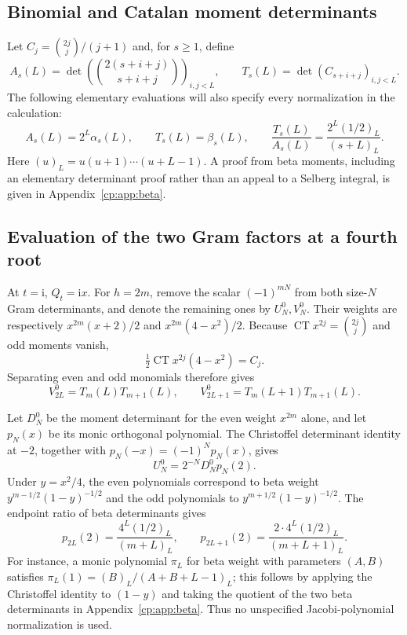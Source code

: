 \documentclass[11pt]{article}
\theoremstyle{definition}
\theoremstyle{remark}
\newcommand{\CT}{\operatorname{CT}}
\newcommand{\ii}{\mathrm i}
\newcommand{\rise}[2]{(#1)_{#2}}
\theoremstyle{definition}
\theoremstyle{plain}
\numberwithin{equation}{section}
\begin{document}
\subsection{Binomial and Catalan moment determinants}
Let $C_j=\binom{2j}{j}/(j+1)$ and, for $s\ge1$, define
\begin{equation}
 A_s(L)=\det\left(\binom{2(s+i+j)}{s+i+j}\right)_{i,j<L},\qquad
 T_s(L)=\det(C_{s+i+j})_{i,j<L}.
 \label{cp:eq:AT}
\end{equation}
The following elementary evaluations will also specify every normalization
in the calculation:
\begin{equation}
 A_s(L)=2^L\alpha_s(L),\qquad T_s(L)=\beta_s(L),\qquad
 \frac{T_s(L)}{A_s(L)}=
 \frac{2^L\rise{1/2}{L}}{\rise{s+L}{L}}.
 \label{cp:eq:ATeval}
\end{equation}
Here $\rise{u}{L}=u(u+1)\cdots(u+L-1)$. A proof from beta moments,
including an elementary determinant proof rather than an appeal to a
Selberg integral, is given in Appendix~\ref{cp:app:beta}.

\subsection{Evaluation of the two Gram factors at a fourth root}
At $t=\ii$, $Q_t=\ii x$. For $h=2m$, remove the scalar
$(-1)^{mN}$ from both size-$N$ Gram determinants, and denote the remaining
ones by $U_N^0,V_N^0$. Their weights are respectively
$x^{2m}(x+2)/2$ and $x^{2m}(4-x^2)/2$.
Because $\CT x^{2j}=\binom{2j}{j}$ and odd moments vanish,
\[
 \tfrac12\CT x^{2j}(4-x^2)=C_j.
\]
Separating even and odd monomials therefore gives
\begin{equation}
 V_{2L}^0=T_m(L)T_{m+1}(L),\qquad
 V_{2L+1}^0=T_m(L+1)T_{m+1}(L).
 \label{cp:eq:V0}
\end{equation}

Let $D_N^0$ be the moment determinant for the even weight $x^{2m}$
alone, and let $p_N(x)$ be its monic orthogonal polynomial. The
Christoffel determinant identity at $-2$, together with
$p_N(-x)=(-1)^Np_N(x)$, gives
\begin{equation}
 U_N^0=2^{-N}D_N^0 p_N(2).
 \label{cp:eq:Christoffel}
\end{equation}
Under $y=x^2/4$, the even polynomials correspond to beta weight
$y^{m-1/2}(1-y)^{-1/2}$ and the odd polynomials to
$y^{m+1/2}(1-y)^{-1/2}$. The endpoint ratio of beta determinants gives
\begin{equation}
 p_{2L}(2)=\frac{4^L\rise{1/2}{L}}{\rise{m+L}{L}},\qquad
 p_{2L+1}(2)=\frac{2\cdot4^L\rise{1/2}{L}}{\rise{m+L+1}{L}}.
 \label{cp:eq:endpoints}
\end{equation}
For instance, a monic polynomial $\pi_L$ for beta weight with parameters
$(A,B)$ satisfies $\pi_L(1)=\rise B L/\rise{A+B+L-1}L$;
this follows by applying the Christoffel identity to $(1-y)$ and taking
the quotient of the two beta determinants in Appendix~\ref{cp:app:beta}.
Thus no unspecified Jacobi-polynomial normalization is used.
\end{document}
